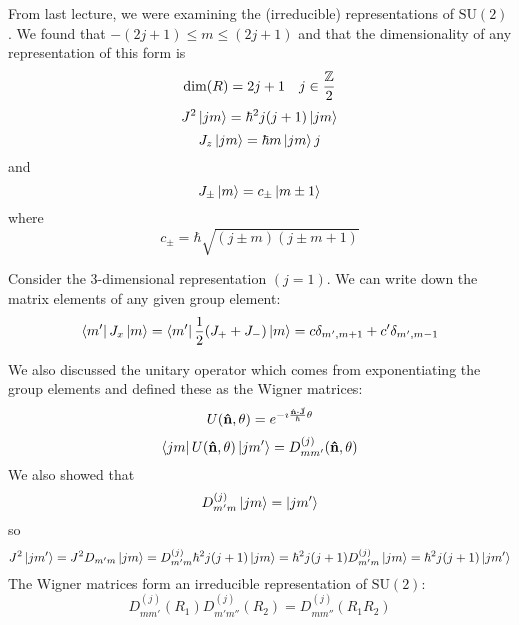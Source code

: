 \documentclass[a4paper,twoside,master.tex]{subfiles}
\begin{document}

From last lecture, we were examining the (irreducible) representations of $\text{SU}(2)$. We found that $ -(2j+1) \leq m \leq (2j+1) $ and that the dimensionality of any representation of this form is
\begin{equation}
    \text{dim}(R) = 2j+1 \quad j \in \frac{\mathbb{Z}}{2}
\end{equation}
\begin{equation}
    J^2\ket{jm} = \hbar^2 j(j+1)\ket{jm}
\end{equation}
\begin{equation}
    J_z\ket{jm} = \hbar m\ket{jm}j
\end{equation}
and
\begin{equation}
    J_{\pm}\ket{m} = c_{\pm}\ket{m \pm 1}
\end{equation}
where
\begin{equation}
    c_{\pm} = \hbar \sqrt{(j \pm m)(j\pm m + 1)}
\end{equation}

Consider the $ 3 $-dimensional representation $ (j = 1) $. We can write down the matrix elements of any given group element:
\begin{equation}
    \bra{m'} J_x\ket{m} =\bra{m'} \frac{1}{2} (J_+ + J_-)\ket{m} = c \delta_{m',m+1} + c' \delta_{m',m-1}
\end{equation}

We also discussed the unitary operator which comes from exponentiating the group elements and defined these as the Wigner matrices:
\begin{equation}
    U(\vu{n}, \theta) = e^{- \imath \frac{\vu{n} \vdot \va{J}}{\hbar} \theta}
\end{equation}
\begin{equation}
    \bra{jm} U(\vu{n}, \theta)\ket{jm'} = D^{(j)}_{mm'}(\vu{n}, \theta)
\end{equation}
We also showed that
\begin{equation}
    D^{(j)}_{m'm}\ket{jm} =\ket{jm'}
\end{equation}
so
\begin{equation}
    J^2\ket{jm'} = J^2 D_{m'm}\ket{jm} = D^{(j)}_{m'm} \hbar^2 j(j+1)\ket{jm} = \hbar^2 j(j+1) D^{(j)}_{m'm}\ket{jm} = \hbar^2 j(j+1)\ket{jm'}
\end{equation}
The Wigner matrices form an irreducible representation of $\text{SU}(2)$:
\begin{equation}
    D^{(j)}_{mm'}(R_1) D^{(j)}_{m'm''}(R_2) = D^{(j)}_{mm''}(R_1 R_2)
\end{equation}
\end{document}
